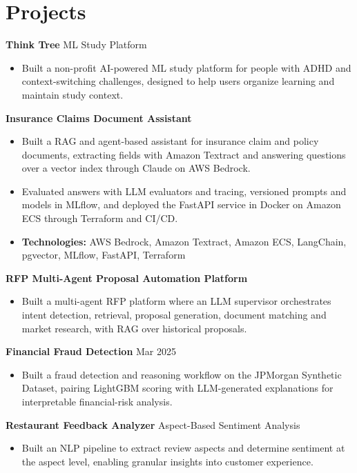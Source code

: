 \documentclass[10pt,a4paper]{article}
\begin{document}
\section{Projects}
\textbf{Think Tree} \textbar{} ML Study Platform\par
\begin{itemize}
  \item Built a non-profit AI-powered ML study platform for people with ADHD and context-switching challenges, designed to help users organize learning and maintain study context.
\end{itemize}
\textbf{Insurance Claims Document Assistant}\par
\begin{itemize}
  \item Built a RAG and agent-based assistant for insurance claim and policy documents, extracting fields with Amazon Textract and answering questions over a vector index through Claude on AWS Bedrock.
  \item Evaluated answers with LLM evaluators and tracing, versioned prompts and models in MLflow, and deployed the FastAPI service in Docker on Amazon ECS through Terraform and CI/CD.
  \item \textbf{Technologies:} AWS Bedrock, Amazon Textract, Amazon ECS, LangChain, pgvector, MLflow, FastAPI, Terraform
\end{itemize}
\textbf{RFP Multi-Agent Proposal Automation Platform}\par
\begin{itemize}
  \item Built a multi-agent RFP platform where an LLM supervisor orchestrates intent detection, retrieval, proposal generation, document matching and market research, with RAG over historical proposals.
\end{itemize}
\textbf{Financial Fraud Detection} \textbar{} Mar 2025\par
\begin{itemize}
  \item Built a fraud detection and reasoning workflow on the JPMorgan Synthetic Dataset, pairing LightGBM scoring with LLM-generated explanations for interpretable financial-risk analysis.
\end{itemize}
\textbf{Restaurant Feedback Analyzer} \textbar{} Aspect-Based Sentiment Analysis\par
\begin{itemize}
  \item Built an NLP pipeline to extract review aspects and determine sentiment at the aspect level, enabling granular insights into customer experience.
\end{itemize}
\end{document}
